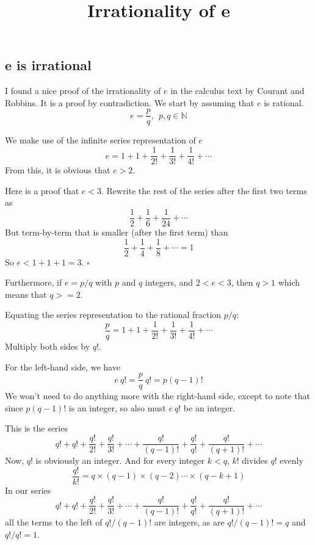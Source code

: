 \documentclass[11pt, oneside]{article}
\title{Irrationality of e}
\date{}
\begin{document}
\maketitle
\Large


\subsection*{e is irrational}

I found a nice proof of the irrationality of $e$ in the calculus text by Courant and Robbins.  It is a proof by contradiction.  We start by assuming that $e$ is rational.
\[ e = \frac{p}{q}, \ \  p,q \in \mathbb{N} \]

We make use of the infinite series representation of $e$
\[ e = 1 + 1 + \frac{1}{2!}  + \frac{1}{3!} + \frac{1}{4!} + \cdots \]
From this, it is obvious that $e > 2$.

Here is a proof that $e < 3$.  Rewrite the rest of the series after the first two terms as
\[  \frac{1}{2}  + \frac{1}{6} + \frac{1}{24} + \cdots \]
But term-by-term that is smaller (after the first term) than
\[ \frac{1}{2}  + \frac{1}{4} + \frac{1}{8} + \cdots = 1 \]
So $e < 1 + 1 + 1 = 3$.  $\square$
 
Furthermore, if $e=p/q$ with $p$ and $q$ integers, and $2 < e < 3$, then $q>1$ which means that $q>=2$.

Equating the series representation to the rational fraction $p/q$:
\[ \frac{p}{q} = 1 + 1 + \frac{1}{2!}  + \frac{1}{3!} + \frac{1}{4!} + \cdots \]
Multiply both sides by $q!$.  

For the left-hand side, we have 
\[ e \ q! = \frac{p}{q} \ q! = p (q-1)! \]
We won't need to do anything more with the right-hand side, except to note that since $p (q-1)!$ is an integer, so also must $e\ q!$ be an integer.  

This is the series
\[ q! + q! + \frac{q!}{2!}  + \frac{q!}{3!}  + \cdots + \frac{q!}{(q-1)!} + \frac{q!}{q!} + \frac{q!}{(q+1)!} + \cdots \]
Now, 
$q!$ is obviously an integer. And for every integer $k < q$, $k!$ divides $q!$ evenly 
\[ \frac{q!}{k!} = q \times (q-1) \times (q-2) \cdots \times (q-k+1) \]
In our series
\[ q! + q! + \frac{q!}{2!}  + \frac{q!}{3!}  + \cdots + \frac{q!}{(q-1)!} + \frac{q!}{q!} + \frac{q!}{(q+1)!} + \cdots \]
all the terms to the left of $q!/(q-1)!$ are integers, as are $q!/(q-1)! = q$ and $q!/q! = 1$.  
\vspace{2 mm}
\end{document}
